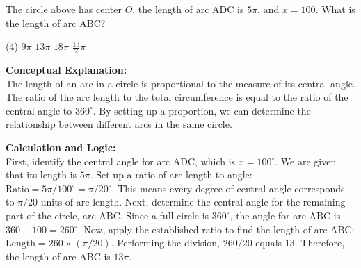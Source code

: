 \documentclass[11pt,paper=a4,answers]{exam}
\begin{document}
\begin{questions}
\pointsinrightmargin
\pointsdroppedatright
\marksnotpoints
{}
\pointformat{\boldmath\themarginpoints}
\bracketedpoints



\question
\begin{center}
\end{center}
The circle above has center $O$, the length of arc $\text{ADC}$ is $5\pi$, and $x = 100$. What is the length of arc $\text{ABC}$?
\begin{tasks}(4)
    \task $9\pi$
    \task $13\pi$
    \task $18\pi$
    \task $\frac{13}{2}\pi$
\end{tasks}

\begin{solution}
\textbf{Conceptual Explanation:} \\
The length of an arc in a circle is proportional to the measure of its central angle. The ratio of the arc length to the total circumference is equal to the ratio of the central angle to $360^\circ$. By setting up a proportion, we can determine the relationship between different arcs in the same circle.

\vspace{30pt}

\textbf{Calculation and Logic:} \\
First, identify the central angle for arc $\text{ADC}$, which is $x = 100^\circ$. We are given that its length is $5\pi$. Set up a ratio of arc length to angle: $\text{Ratio} = 5\pi / 100^\circ = \pi / 20^\circ$. This means every degree of central angle corresponds to $\pi/20$ units of arc length. Next, determine the central angle for the remaining part of the circle, arc $\text{ABC}$. Since a full circle is $360^\circ$, the angle for arc $\text{ABC}$ is $360 - 100 = 260^\circ$. Now, apply the established ratio to find the length of arc $\text{ABC}$: $\text{Length} = 260 \times (\pi / 20)$. Performing the division, $260 / 20$ equals 13. Therefore, the length of arc $\text{ABC}$ is $13\pi$.


\end{solution}
\end{questions}
\end{document}
